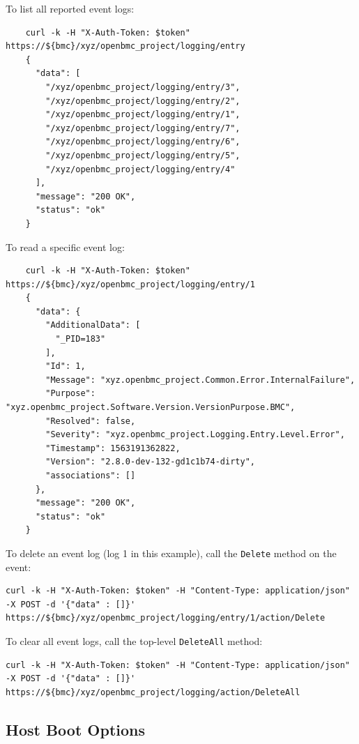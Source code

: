 To list all reported event logs:

\begin{verbatim}
    curl -k -H "X-Auth-Token: $token" https://${bmc}/xyz/openbmc_project/logging/entry
    {
      "data": [
        "/xyz/openbmc_project/logging/entry/3",
        "/xyz/openbmc_project/logging/entry/2",
        "/xyz/openbmc_project/logging/entry/1",
        "/xyz/openbmc_project/logging/entry/7",
        "/xyz/openbmc_project/logging/entry/6",
        "/xyz/openbmc_project/logging/entry/5",
        "/xyz/openbmc_project/logging/entry/4"
      ],
      "message": "200 OK",
      "status": "ok"
    }
\end{verbatim}

To read a specific event log:

\begin{verbatim}
    curl -k -H "X-Auth-Token: $token" https://${bmc}/xyz/openbmc_project/logging/entry/1
    {
      "data": {
        "AdditionalData": [
          "_PID=183"
        ],
        "Id": 1,
        "Message": "xyz.openbmc_project.Common.Error.InternalFailure",
        "Purpose": "xyz.openbmc_project.Software.Version.VersionPurpose.BMC",
        "Resolved": false,
        "Severity": "xyz.openbmc_project.Logging.Entry.Level.Error",
        "Timestamp": 1563191362822,
        "Version": "2.8.0-dev-132-gd1c1b74-dirty",
        "associations": []
      },
      "message": "200 OK",
      "status": "ok"
    }
\end{verbatim}

To delete an event log (log 1 in this example), call the \texttt{Delete}
method on the event:

\begin{verbatim}
curl -k -H "X-Auth-Token: $token" -H "Content-Type: application/json" -X POST -d '{"data" : []}' https://${bmc}/xyz/openbmc_project/logging/entry/1/action/Delete
\end{verbatim}

To clear all event logs, call the top-level \texttt{DeleteAll} method:

\begin{verbatim}
curl -k -H "X-Auth-Token: $token" -H "Content-Type: application/json" -X POST -d '{"data" : []}' https://${bmc}/xyz/openbmc_project/logging/action/DeleteAll
\end{verbatim}

\hypertarget{host-boot-options}{%
\subsection{Host Boot Options}\label{host-boot-options}}

